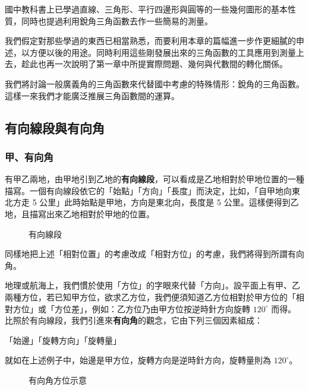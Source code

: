 國中教科書上已學過直線、三角形、平行四邊形與圓等的一些幾何圖形的基本性質，同時也提過利用銳角三角函數去作一些簡易的測量。

我們假定對那些學過的東西已相當熟悉，而要利用本章的篇幅進一步作更細膩的申述，以方便以後的用途。同時利用這些剛發展出來的三角函數的工具應用到測量上去，趁此也再一次說明了第一章中所提實際問題、幾何與代數間的轉化關係。

我們將討論一般廣義角的三角函數來代替國中考慮的特殊情形：銳角的三角函數。這樣一來我們才能廣泛推展三角函數間的運算。

\subsection{有向線段與有向角}
\label{subsec:b3-2-1}

\subsubsection*{甲、有向角}

有甲乙兩地，由甲地引到乙地的\textbf{有向線段}，可以看成是乙地相對於甲地位置的一種描寫。一個有向線段依它的「始點」「方向」「長度」而決定，比如，「自甲地向東北方走 5 公里」此時始點是甲地，方向是東北向，長度是 5 公里。這樣便得到乙地，且描寫出來乙地相對於甲地的位置。

\begin{figure}[H]
\centering
{}
\caption{有向線段}
\label{fig:b3-fig2-1}
\end{figure}

同樣地把上述「相對位置」的考慮改成「相對方位」的考慮，我們將得到所謂有向角。

地理或航海上，我們慣於使用「方位」的字眼來代替「方向」。設平面上有甲、乙兩種方位，若已知甲方位，欲求乙方位，我們便須知道乙方位相對於甲方位的「相對方位」或「方位差」，例如：乙方位乃由甲方位按逆時針方向旋轉 $120^\circ$ 而得。比照於有向線段，我們引進來\textbf{有向角}的觀念，它由下列三個因素組成：

「始邊」「旋轉方向」「旋轉量」

就如在上述例子中，始邊是甲方位，旋轉方向是逆時針方向，旋轉量則為 $120^\circ$。

\begin{figure}[H]
\centering
{}
\caption{有向角方位示意}
\label{fig:b3-fig2-2}
\end{figure}

